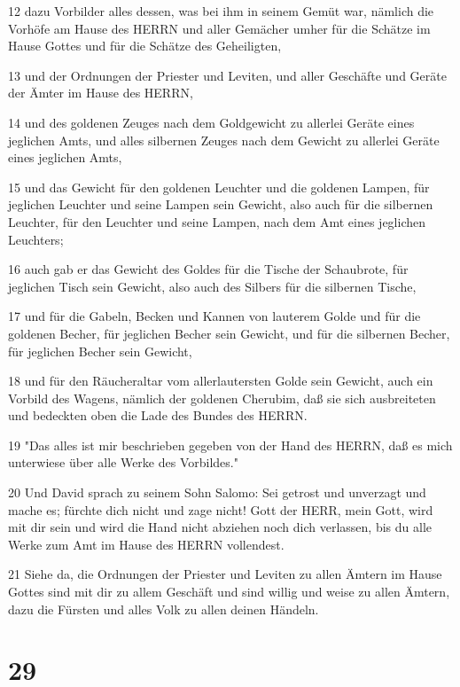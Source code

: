 \par 12 dazu Vorbilder alles dessen, was bei ihm in seinem Gemüt war, nämlich die Vorhöfe am Hause des HERRN und aller Gemächer umher für die Schätze im Hause Gottes und für die Schätze des Geheiligten,
\par 13 und der Ordnungen der Priester und Leviten, und aller Geschäfte und Geräte der Ämter im Hause des HERRN,
\par 14 und des goldenen Zeuges nach dem Goldgewicht zu allerlei Geräte eines jeglichen Amts, und alles silbernen Zeuges nach dem Gewicht zu allerlei Geräte eines jeglichen Amts,
\par 15 und das Gewicht für den goldenen Leuchter und die goldenen Lampen, für jeglichen Leuchter und seine Lampen sein Gewicht, also auch für die silbernen Leuchter, für den Leuchter und seine Lampen, nach dem Amt eines jeglichen Leuchters;
\par 16 auch gab er das Gewicht des Goldes für die Tische der Schaubrote, für jeglichen Tisch sein Gewicht, also auch des Silbers für die silbernen Tische,
\par 17 und für die Gabeln, Becken und Kannen von lauterem Golde und für die goldenen Becher, für jeglichen Becher sein Gewicht, und für die silbernen Becher, für jeglichen Becher sein Gewicht,
\par 18 und für den Räucheraltar vom allerlautersten Golde sein Gewicht, auch ein Vorbild des Wagens, nämlich der goldenen Cherubim, daß sie sich ausbreiteten und bedeckten oben die Lade des Bundes des HERRN.
\par 19 "Das alles ist mir beschrieben gegeben von der Hand des HERRN, daß es mich unterwiese über alle Werke des Vorbildes."
\par 20 Und David sprach zu seinem Sohn Salomo: Sei getrost und unverzagt und mache es; fürchte dich nicht und zage nicht! Gott der HERR, mein Gott, wird mit dir sein und wird die Hand nicht abziehen noch dich verlassen, bis du alle Werke zum Amt im Hause des HERRN vollendest.
\par 21 Siehe da, die Ordnungen der Priester und Leviten zu allen Ämtern im Hause Gottes sind mit dir zu allem Geschäft und sind willig und weise zu allen Ämtern, dazu die Fürsten und alles Volk zu allen deinen Händeln.

\chapter{29}

